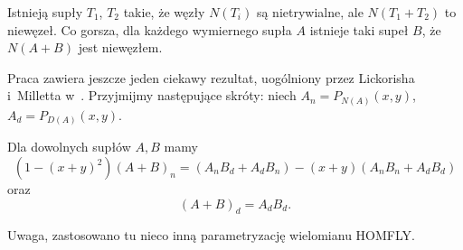Istnieją supły $T_1$, $T_2$ takie, że węzły $N(T_i)$ są nietrywialne, ale $N(T_1 + T_2)$ to niewęzeł.
Co gorsza, dla każdego wymiernego supła $A$ istnieje taki supeł $B$, że $N(A+B)$ jest niewęzłem.

Praca \cite{conway70} zawiera jeszcze jeden ciekawy rezultat, uogólniony przez Lickorisha i~Milletta w~\cite{lickorish87}.
Przyjmijmy następujące skróty: niech $A_n = P_{N(A)}(x,y)$, $A_d = P_{D(A)}(x,y)$.

\begin{proposition}
    Dla dowolnych supłów $A, B$ mamy
    \[
    (1 - (x+y)^2)(A+B)_n = (A_nB_d + A_dB_n) - (x+y)(A_nB_n+  A_dB_d)
    \]
    oraz
    \[
        (A+B)_d = A_dB_d.
    \]
\end{proposition}

Uwaga, zastosowano tu nieco inną parametryzację wielomianu HOMFLY.





